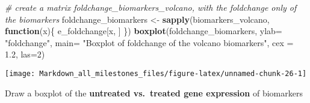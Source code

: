 \documentclass[]{article}
\newenvironment{Shaded}{\begin{snugshade}}{\end{snugshade}}
\newcommand{\CommentTok}[1]{\textcolor[rgb]{0.56,0.35,0.01}{\textit{#1}}}
\newcommand{\ControlFlowTok}[1]{\textcolor[rgb]{0.13,0.29,0.53}{\textbf{#1}}}
\newcommand{\DataTypeTok}[1]{\textcolor[rgb]{0.13,0.29,0.53}{#1}}
\newcommand{\DecValTok}[1]{\textcolor[rgb]{0.00,0.00,0.81}{#1}}
\newcommand{\FloatTok}[1]{\textcolor[rgb]{0.00,0.00,0.81}{#1}}
\newcommand{\KeywordTok}[1]{\textcolor[rgb]{0.13,0.29,0.53}{\textbf{#1}}}
\newcommand{\NormalTok}[1]{#1}
\newcommand{\StringTok}[1]{\textcolor[rgb]{0.31,0.60,0.02}{#1}}
\begin{document}
\begin{Shaded}
\begin{Highlighting}[]
\CommentTok{# create a matrix foldchange_biomarkers_volcano, with the foldchange only of the biomarkers}
\NormalTok{foldchange_biomarkers <-}\StringTok{ }\KeywordTok{sapply}\NormalTok{(biomarkers_volcano, }\ControlFlowTok{function}\NormalTok{(x)\{}
\NormalTok{  e_foldchange[x, ]}
\NormalTok{\})}
\KeywordTok{boxplot}\NormalTok{(foldchange_biomarkers, }\DataTypeTok{ylab=} \StringTok{"foldchange"}\NormalTok{, }
        \DataTypeTok{main=} \StringTok{"Boxplot of foldchange of the volcano biomarkers"}\NormalTok{, }\DataTypeTok{cex =} \FloatTok{1.2}\NormalTok{, }\DataTypeTok{las=}\DecValTok{2}\NormalTok{)}
\end{Highlighting}
\end{Shaded}

\begin{center}\texttt{[image: Markdown\_all\_milestones\_files/figure-latex/unnamed-chunk-26-1]} \end{center}

Draw a boxplot of the \textbf{untreated vs.~treated gene expression} of
biomarkers
\end{document}
